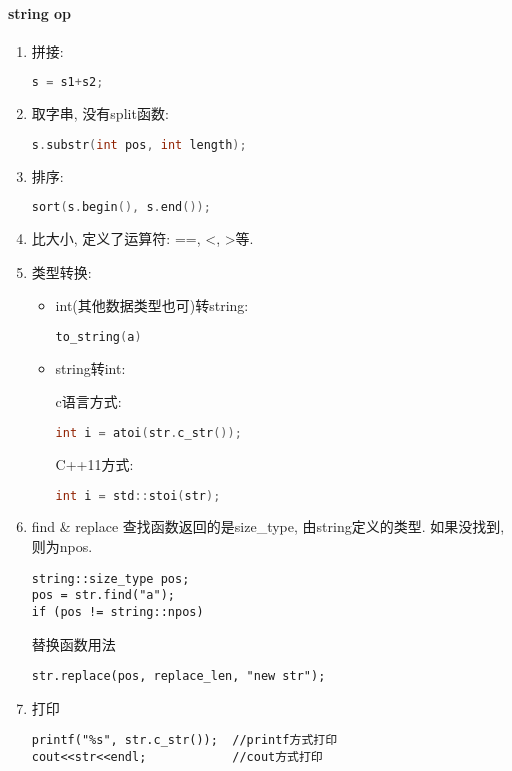 \documentclass[UTF8]{ctexart}
\begin{document}
\paragraph{string op}
\begin{enumerate}[(1)]
\item 拼接:
\begin{lstlisting}[language=C]
s = s1+s2;
\end{lstlisting}
\item 取字串, 没有split函数: 
\begin{lstlisting}[language=C]
s.substr(int pos, int length);
\end{lstlisting}
\item 排序: 
\begin{lstlisting}[language=C]
sort(s.begin(), s.end());
\end{lstlisting}
\item 比大小, 定义了运算符: ==, <, >等.
\item 类型转换:
\begin{itemize}
\item int(其他数据类型也可)转string:
\begin{lstlisting}[language=C]
to_string(a)
\end{lstlisting}
\item string转int:


c语言方式:
\begin{lstlisting}[language=C]
int i = atoi(str.c_str());
\end{lstlisting}
C++11方式:
\begin{lstlisting}[language=C]
int i = std::stoi(str);
\end{lstlisting}
\end{itemize}
\item find \& replace
查找函数返回的是size\_type, 由string定义的类型. 如果没找到, 则为npos.
\begin{lstlisting}
string::size_type pos;
pos = str.find("a");
if (pos != string::npos)
\end{lstlisting}
替换函数用法
\begin{lstlisting}
str.replace(pos, replace_len, "new str");
\end{lstlisting}
\item 打印
\begin{lstlisting}
printf("%s", str.c_str());  //printf方式打印
cout<<str<<endl;            //cout方式打印
\end{lstlisting}
\end{enumerate}
\end{document}
